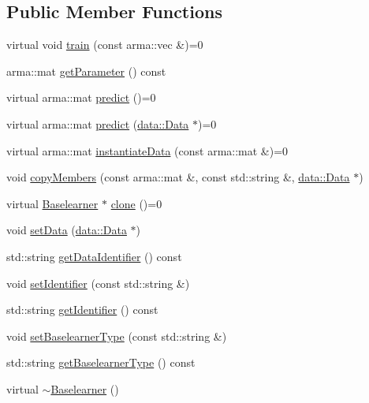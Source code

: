 \subsection*{Public Member Functions}
\begin{DoxyCompactItemize}
\item 
virtual void \hyperlink{classblearner_1_1_baselearner_a40e03ad070b9a03aae706d9ee8094b80}{train} (const arma\+::vec \&)=0
\item 
arma\+::mat \hyperlink{classblearner_1_1_baselearner_a3362fe72e1b653ec3664cae2397414ed}{get\+Parameter} () const
\item 
virtual arma\+::mat \hyperlink{classblearner_1_1_baselearner_ab37986047db43c84420fef2cef7fc20d}{predict} ()=0
\item 
virtual arma\+::mat \hyperlink{classblearner_1_1_baselearner_ae2ef5e018783578e02b3b5a33fa94eae}{predict} (\hyperlink{classdata_1_1_data}{data\+::\+Data} $\ast$)=0
\item 
virtual arma\+::mat \hyperlink{classblearner_1_1_baselearner_af01f1b8c4540927705ff79c3649489f7}{instantiate\+Data} (const arma\+::mat \&)=0
\item 
void \hyperlink{classblearner_1_1_baselearner_ae8f114ca7c497f03c80de5981c7f811d}{copy\+Members} (const arma\+::mat \&, const std\+::string \&, \hyperlink{classdata_1_1_data}{data\+::\+Data} $\ast$)
\item 
virtual \hyperlink{classblearner_1_1_baselearner}{Baselearner} $\ast$ \hyperlink{classblearner_1_1_baselearner_a8e12c6739f085917a7d2da6570c51a21}{clone} ()=0
\item 
void \hyperlink{classblearner_1_1_baselearner_a29122c6125ef6ec03ad84602b3e2d0d4}{set\+Data} (\hyperlink{classdata_1_1_data}{data\+::\+Data} $\ast$)
\item 
std\+::string \hyperlink{classblearner_1_1_baselearner_a2393dc1e3cf90919ebbbd237fe303860}{get\+Data\+Identifier} () const
\item 
void \hyperlink{classblearner_1_1_baselearner_a6669906a481cbdd516dce8df6f6e5b76}{set\+Identifier} (const std\+::string \&)
\item 
std\+::string \hyperlink{classblearner_1_1_baselearner_aa10fa4301aeb37f6e8c18457541c3be7}{get\+Identifier} () const
\item 
void \hyperlink{classblearner_1_1_baselearner_a8d78e851bae5f5b93dc46eb13d2d1ee1}{set\+Baselearner\+Type} (const std\+::string \&)
\item 
std\+::string \hyperlink{classblearner_1_1_baselearner_acec1a791f94eed39d2662c245e7f6b51}{get\+Baselearner\+Type} () const
\item 
virtual \hyperlink{classblearner_1_1_baselearner_a1ada1c47d71e60bec80ab033ffa40813}{$\sim$\+Baselearner} ()
\end{DoxyCompactItemize}
